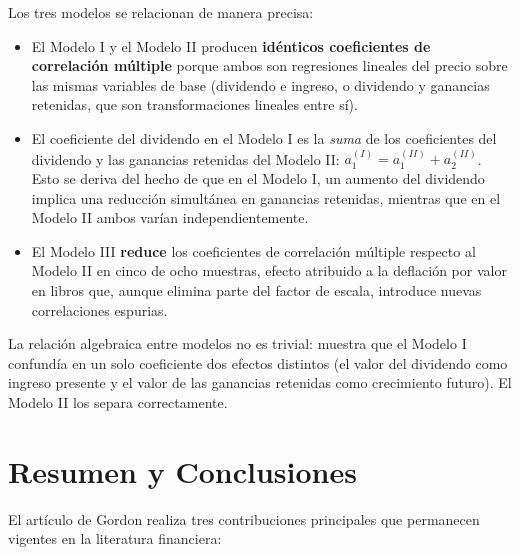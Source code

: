 \documentclass[12pt]{article}
\begin{document}
Los tres modelos se relacionan de manera precisa:
\begin{itemize}
  \item El Modelo I y el Modelo II producen \textbf{id\'enticos coeficientes de correlaci\'on m\'ultiple} porque ambos son regresiones lineales del precio sobre las mismas variables de base (dividendo e ingreso, o dividendo y ganancias retenidas, que son transformaciones lineales entre s\'i).
  \item El coeficiente del dividendo en el Modelo I es la \textit{suma} de los coeficientes del dividendo y las ganancias retenidas del Modelo II: $a_1^{(I)} = a_1^{(II)} + a_2^{(II)}$. Esto se deriva del hecho de que en el Modelo I, un aumento del dividendo implica una reducci\'on simult\'anea en ganancias retenidas, mientras que en el Modelo II ambos var\'ian independientemente.
  \item El Modelo III \textbf{reduce} los coeficientes de correlaci\'on m\'ultiple respecto al Modelo II en cinco de ocho muestras, efecto atribuido a la deflaci\'on por valor en libros que, aunque elimina parte del factor de escala, introduce nuevas correlaciones espurias.
\end{itemize}

\begin{intuicion}
La relaci\'on algebraica entre modelos no es trivial: muestra que el Modelo I confund\'ia en un solo coeficiente dos efectos distintos (el valor del dividendo como ingreso presente y el valor de las ganancias retenidas como crecimiento futuro). El Modelo II los separa correctamente.
\end{intuicion}

\section{Resumen y Conclusiones}

El art\'iculo de Gordon realiza tres contribuciones principales que permanecen vigentes en la literatura financiera:
\end{document}
